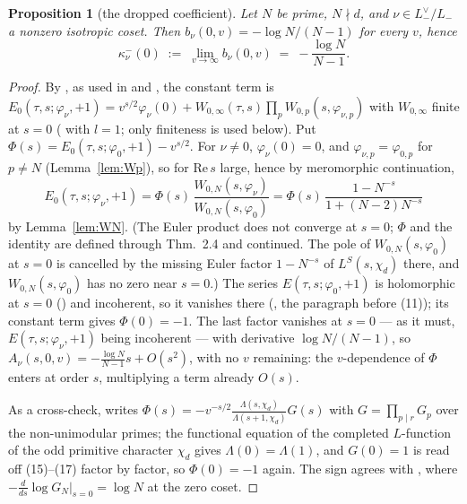 \documentclass[11pt,reqno]{amsart}
\theoremstyle{plain}
\newtheorem{proposition}[theorem]{Proposition}
\theoremstyle{definition}
\newcommand{\Lm}{L_{-}}
\begin{document}
\begin{proposition}[the dropped coefficient]\label{prop:kappa0}
Let $N$ be prime, $N\nmid d$, and $\nu\in\Lm^\vee/\Lm$ a nonzero isotropic coset. Then
$b_\nu(0,v)=-\log N/(N-1)$ for every $v$, hence
\[
  \kappa^-_\nu(0)\;:=\;\lim_{v\to\infty}b_\nu(0,v)\;=\;-\frac{\log N}{N-1}.
\]
\end{proposition}
\begin{proof}
By \cite[Thm.~2.4]{KY}, as used in \cite[proof of Lemma~2.21]{Schofer} and \cite[(14)]{Yang}, the
constant term is $E_0(\tau,s;\varphi_\nu,+1)=v^{s/2}\varphi_\nu(0)+W_{0,\infty}(\tau,s)\prod_p
W_{0,p}(s,\varphi_{\nu,p})$ with $W_{0,\infty}$ finite at $s=0$ (\cite[Prop.~2.3(iii)]{KY} with $l=1$; only finiteness is
used below). Put $\Phi(s)=E_0(\tau,s;\varphi_0,+1)-v^{s/2}$. For $\nu\neq0$, $\varphi_\nu(0)=0$, and
$\varphi_{\nu,p}=\varphi_{0,p}$ for $p\neq N$ (Lemma~\ref{lem:Wp}), so for $\mathrm{Re}\,s$ large,
hence by meromorphic continuation,
\[
  E_0(\tau,s;\varphi_\nu,+1)
   =\Phi(s)\,\frac{W_{0,N}(s,\varphi_\nu)}{W_{0,N}(s,\varphi_0)}
   =\Phi(s)\,\frac{1-N^{-s}}{1+(N-2)N^{-s}}
\]
by Lemma~\ref{lem:WN}. (The Euler product does not converge at $s=0$; $\Phi$ and the identity are
defined through Thm.~2.4 and continued. The pole of $W_{0,N}(s,\varphi_0)$ at $s=0$ is cancelled
by the missing Euler factor $1-N^{-s}$ of $L^S(s,\chi_d)$ there, and $W_{0,N}(s,\varphi_0)$ has no
zero near $s=0$.) The series $E(\tau,s;\varphi_0,+1)$ is holomorphic at $s=0$
(\cite[Cor.~2.5]{KY}) and incoherent, so it vanishes there (\cite{Yang}, the paragraph before
(11)); its constant term gives $\Phi(0)=-1$. The last factor vanishes at $s=0$ --- as it must,
$E(\tau,s;\varphi_\nu,+1)$ being incoherent --- with derivative $\log N/(N-1)$, so
$A_\nu(s,0,v)=-\frac{\log N}{N-1}s+O(s^2)$, with no $v$ remaining: the $v$-dependence of $\Phi$
enters at order $s$, multiplying a term already $O(s)$.

As a cross-check, \cite[(14)]{Yang} writes $\Phi(s)=-v^{-s/2}\frac{\Lambda(s,\chi_d)}
{\Lambda(s+1,\chi_d)}G(s)$ with $G=\prod_{p\mid r}G_p$ over the non-unimodular primes; the
functional equation of the completed $L$-function of the odd primitive character $\chi_d$ gives
$\Lambda(0)=\Lambda(1)$, and $G(0)=1$ is read off (15)--(17) factor by factor, so $\Phi(0)=-1$
again. The sign agrees with \cite[Lemma~20]{Yang}, where $-\frac{d}{ds}\log G_N\big|_{s=0}=\log N$
at the zero coset.
\end{proof}
\end{document}
